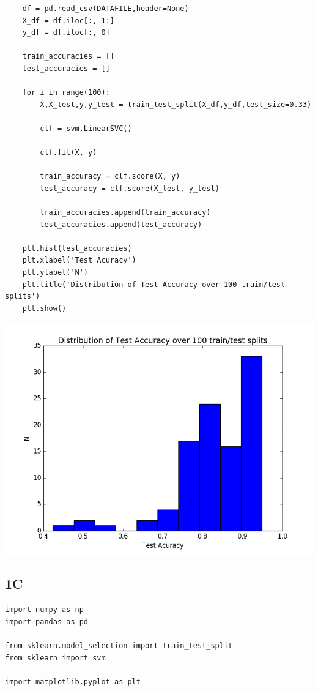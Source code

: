 \documentclass[12pt]{article}
\begin{document}
\begin{flushleft}
\begin{lstlisting}
	df = pd.read_csv(DATAFILE,header=None)
	X_df = df.iloc[:, 1:]
	y_df = df.iloc[:, 0]
	
	train_accuracies = []
	test_accuracies = []
	
	for i in range(100):
		X,X_test,y,y_test = train_test_split(X_df,y_df,test_size=0.33)
		
		clf = svm.LinearSVC()
		
		clf.fit(X, y)
		
		train_accuracy = clf.score(X, y)
		test_accuracy = clf.score(X_test, y_test)
		
		train_accuracies.append(train_accuracy)
		test_accuracies.append(test_accuracy)
	
	plt.hist(test_accuracies)
	plt.xlabel('Test Acuracy')
	plt.ylabel('N')
	plt.title('Distribution of Test Accuracy over 100 train/test splits')
	plt.show()

			\end{lstlisting}
			
			\includegraphics[scale=0.5]{HW3_1B.png}
			\label{fig:graph 1B}
		
		
		\subsection*{1C}
		
			\begin{lstlisting}
import numpy as np 
import pandas as pd

from sklearn.model_selection import train_test_split
from sklearn import svm

import matplotlib.pyplot as plt


\end{lstlisting}
\end{flushleft}
\end{document}
